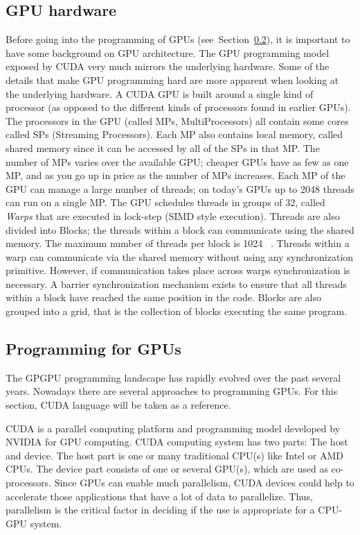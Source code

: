 \documentclass[Ingles]{ic-tese-v1}
\newcommand{\rsec}[1]{Section~\ref{sec:#1}}
\newcommand{\tit}[1]{{\textit{#1}}}
\begin{document}
\subsection{GPU hardware}
\label{sec:gpugardware}
Before going into the programming of GPUs (see~\rsec{gpuprogramming}), it is
important to have some background on GPU architecture.  The GPU programming
model exposed by CUDA very much mirrors the underlying hardware. Some of the
details that make GPU programming hard are more apparent when looking at the
underlying hardware.  A CUDA GPU is built around a single kind of processor (as
opposed to the different kinds of processors found in earlier GPUs). The
processors in the GPU (called MPs, MultiProcessors) all contain some
cores called SPs (Streaming Processors).  Each MP also contains local memory,
called shared memory since it can be accessed by all of the SPs in that MP. The
number of MPs varies over the available GPU; cheaper GPUs have as few as one
MP, and as you go up in price as the number of MPs increases.  Each MP of the GPU
can manage a large number of threads; on today’s GPUs up to 2048 threads can
run on a single MP. The GPU schedules threads in groups of 32, called \tit{Warps}
that are executed in lock-step (SIMD style execution). Threads are also divided
into Blocks; the threads within a block can communicate using the shared
memory. The maximum number of threads per block is 1024
~\cite{NvidiaGuide2018}. Threads within a warp can communicate via the shared
memory without using any synchronization primitive. However, if communication
takes place across warps synchronization is necessary. A barrier
synchronization mechanism exists to ensure that all threads within a block have
reached the same position in the code. Blocks are also grouped into a grid,
that is the collection of blocks executing the same program.

\subsection{Programming for GPUs}
\label{sec:gpuprogramming}
The GPGPU programming landscape has rapidly evolved over the past several
years. Nowadays there are several approaches to
programming GPUs. For this section, CUDA language will be taken as a reference.

CUDA is a parallel computing platform and programming model developed by NVIDIA
 for GPU computing.  CUDA computing system has two parts: The host and
device.  The host part is one or many traditional CPU(s) like Intel or AMD
CPUs. The device part consists of one or several GPU(s), which are used as
co-processors. Since GPUs can enable much  parallelism, CUDA devices could
help to accelerate those applications that have a lot of data to  parallelize.
Thus, parallelism is the critical factor in deciding if the use is appropriate
for a CPU-GPU system.
\end{document}
